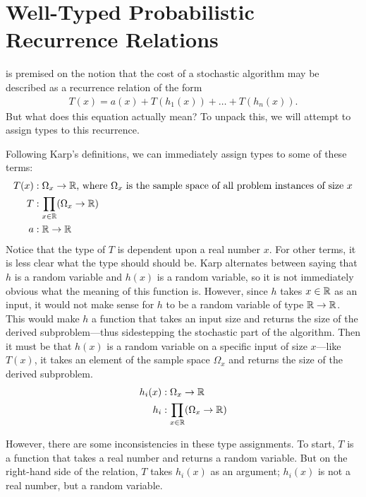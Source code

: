 \chapter{Well-Typed Probabilistic Recurrence Relations}
\cite{Karp} is premised on the notion that the cost of a stochastic algorithm may be described as a
recurrence relation of the form
\begin{align*}
T(x) = a(x) + T(h_1(x)) + \dots + T(h_n(x)).
\end{align*}
But what does this equation actually mean? To unpack this, we will attempt to assign types to this recurrence.

 Following Karp's definitions, we can immediately assign types to some of these terms:
\begin{align*}
T(x) &: \Omega_x \rightarrow \mathbb{R} \text{, where } \Omega_x \text{ is the sample space of all problem instances of size } x \\
T &: \prod_{x \in \mathbb{R}} (\Omega_x \rightarrow \mathbb{R}) \\ 
a &: \mathbb{R} \rightarrow \mathbb{R}
\end{align*}
Notice that the type of $T$ is dependent upon a real number $x$.
For other terms, it is less clear what the type should should be. Karp alternates between saying that $h$ is a random 
variable and $h(x)$ is a random variable, so it is not immediately obvious 
what the meaning of this function is. However, since $h$ takes $x \in \mathbb{R}$ as an input, it would not make sense for $h$ to be a 
random variable of type $\mathbb{R} \rightarrow \mathbb{R}$. This would make $h$ a function that takes an input size and returns the 
size of the derived subproblem---thus sidestepping the stochastic part of the algorithm. Then it must be that $h(x)$ is a 
random variable on a specific input of size $x$---like $T(x)$, it takes an element of the sample space $\Omega_x$ and returns the size of the derived 
subproblem.
\begin{align*}
h_i(x) &: \Omega_x \rightarrow \mathbb{R} \\
h_i &: \prod_{x \in \mathbb{R}}(\Omega_x \rightarrow \mathbb{R}) 
\end{align*} 

However, there are some inconsistencies in these type assignments. To start, $T$ is a function that takes a real number and 
returns a random variable. But on the right-hand side of the relation, $T$ takes $h_i(x)$ as an argument; $h_i(x)$ is
not a real number, but a random variable. 

